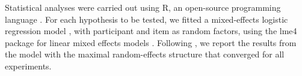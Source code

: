 Statistical analyses were carried out using R, an open-source programming language \citep{R}. For each hypothesis to be tested, we fitted a mixed-effects logistic regression model \citep{Jaeger2008}, with participant and item as random factors, using the lme4 package for linear mixed effects models \citep{Bates}. Following \citet{Baayen:etal:2008}, we report the results from the model with the maximal random-effects structure that converged for all experiments. 


